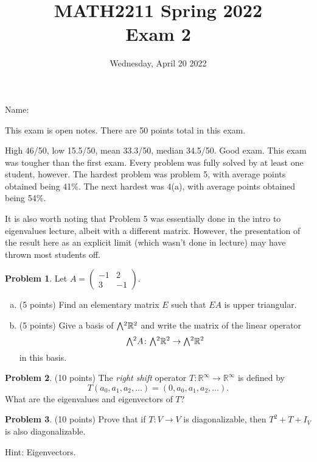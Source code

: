 \documentclass[11pt,oneside]{amsart}
\title{MATH2211 Spring 2022\\
Exam 2}
\author{Wednesday, April 20 2022}
\theoremstyle{definition}
\newtheorem{problem}{Problem}
\newcommand{\bR}{\mathbb{R}}
\newcommand{\extp}{\mathchoice{{\textstyle\bigwedge}}%
    {{\bigwedge}}%
    {{\textstyle\wedge}}%
    {{\scriptstyle\wedge}}}
\begin{document}
    \maketitle

    Name: \underline{\hspace{6cm}}

    This exam is open notes. There are 50 points total in this exam.

    {\color{maroon}
    High 46/50, low 15.5/50, mean 33.3/50, median 34.5/50. Good exam. This exam was tougher than the first exam. Every problem was fully solved by at least one student, however. The hardest problem was problem 5, with average points obtained being 41\%. The next hardest was 4(a), with average points obtained being 54\%.

    It is also worth noting that Problem 5 was essentially done in the intro to eigenvalues lecture, albeit with a different matrix. However, the presentation of the result here as an explicit limit (which wasn't done in lecture) may have thrown most students off.
    }

    \begin{problem}
        Let $A=\begin{pmatrix}
            -1&2\\
            3&-1
        \end{pmatrix}$.
        \begin{enumerate}[(a)]
            \item (5 points) Find an elementary matrix $E$ such that $EA$ is upper triangular.
            \vfill
            \item (5 points) Give a basis of $\extp^2\bR^2$ and write the matrix of the linear operator
            \[\extp^2 A\colon \extp^2 \bR^2\to \extp^2\bR^2\]
            in this basis.
            \vfill
        \end{enumerate}
    \end{problem}
    

    \begin{problem}
       (10 points) The \emph{right shift} operator $T\colon \bR^\infty\to\bR^\infty$ is defined by
       \[T(a_0,a_1,a_2,\dots)=(0,a_0,a_1,a_2,\dots).\]
       What are the eigenvalues and eigenvectors of $T$?
    \end{problem}
    

    \begin{problem}
        (10 points) Prove that if $T\colon V\to V$ is diagonalizable, then $T^2+T+I_V$ is also diagonalizable.

        Hint: Eigenvectors.
    \end{problem}
    \vfill
    
\end{document}

